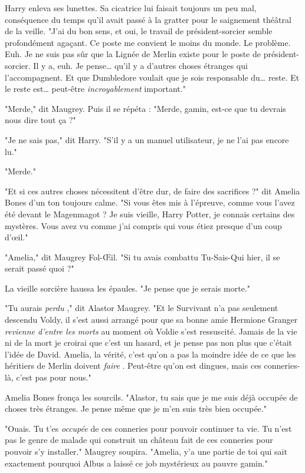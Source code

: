 Harry enleva ses lunettes. Sa cicatrice lui faisait toujours un peu mal, conséquence du temps qu'il avait passé à la gratter pour le saignement théâtral de la veille. "J'ai du bon sens, et oui, le travail de président-sorcier semble profondément agaçant. Ce poste me convient le moins du monde. Le problème. Euh. Je ne suis pas sûr que la Lignée de Merlin existe pour le poste de président-sorcier. Il y a, euh. Je pense… qu'il y a d'autres choses étranges qui l'accompagnent. Et que Dumbledore voulait que je sois responsable du… reste. Et le reste est… peut-être \emph{incroyablement}  important."

"Merde," dit Maugrey. Puis il se répéta : "Merde, gamin, est-ce que tu devrais nous dire tout ça ?"

"Je ne sais pas," dit Harry. "S'il y a un manuel utilisateur, je ne l'ai pas encore lu."

"Merde."

"Et si ces autres choses nécessitent d'être dur, de faire des sacrifices ?" dit Amelia Bones d'un ton toujours calme. "Si vous êtes mis à l'épreuve, comme vous l'avez été devant le Magenmagot ? Je suis vieille, Harry Potter, je connais certains des mystères. Vous avez vu comme j'ai compris qui vous étiez presque d'un coup d'œil."

"Amelia," dit Maugrey Fol-Œil. "Si tu avais combattu Tu-Sais-Qui hier, il se serait passé quoi ?"

La vieille sorcière haussa les épaules. "Je pense que je serais morte."

"Tu aurais \emph{perdu} ," dit Alastor Maugrey. "Et le Survivant n'a pas seulement descendu Voldy, il s'est aussi arrangé pour que sa bonne amie Hermione Granger \emph{revienne d'entre les morts}  au moment où Voldie s'est ressuscité. Jamais de la vie ni de la mort je croirai que c'est un hasard, et je pense pas non plus que c'était l'idée de David. Amelia, la vérité, c'est qu'on a pas la moindre idée de ce que les héritiers de Merlin doivent \emph{faire} . Peut-être qu'on est dingues, mais ces conneries-là, c'est pas pour nous."

Amelia Bones fronça les sourcils. "Alastor, tu sais que je me suis déjà occupée de choses très étranges. Je pense même que je m'en suis très bien occupée."

"Ouais. Tu t'es \emph{occupée}  de ces conneries pour pouvoir continuer ta vie. Tu n'est pas le genre de malade qui construit un château fait de ces conneries pour pouvoir s'y installer." Maugrey soupira. "Amelia, y'a une partie de toi qui sait exactement pourquoi Albus a laissé ce job mystérieux au pauvre gamin."

